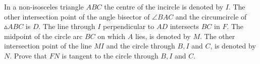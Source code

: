 In a non-isosceles triangle $ABC$ the centre of the incircle is denoted by $I$. The other intersection point of the angle bisector of $\angle BAC$ and the circumcircle of $\vartriangle ABC$ is $D$. The line through $I$ perpendicular to $AD$ intersects $BC$ in $F$. The midpoint of the circle arc $BC$ on which $A$ lies, is denoted by $M$. The other intersection point of the line $MI$ and the circle through $B, I$ and $C$,  is denoted by $N$. Prove that $FN$ is tangent to the circle through $B, I$ and $C$.